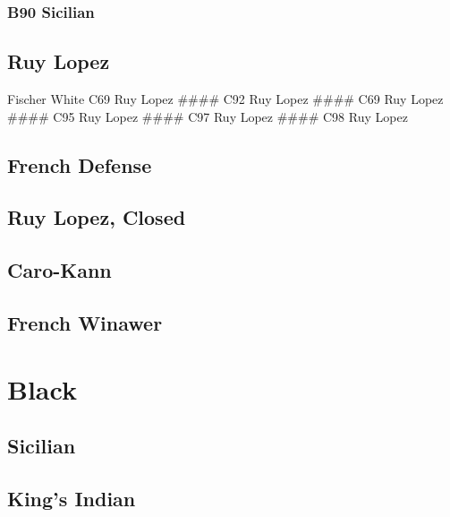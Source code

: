 \documentclass[]{book}
\begin{document}
\hypertarget{b90-sicilian}{%
\subsubsection{B90 Sicilian}\label{b90-sicilian}}

\hypertarget{ruy-lopez}{%
\subsection{Ruy Lopez}\label{ruy-lopez}}

Fischer White C69 Ruy Lopez
\#\#\#\# C92 Ruy Lopez
\#\#\#\# C69 Ruy Lopez
\#\#\#\# C95 Ruy Lopez
\#\#\#\# C97 Ruy Lopez
\#\#\#\# C98 Ruy Lopez

\hypertarget{french-defense}{%
\subsection{French Defense}\label{french-defense}}

\hypertarget{ruy-lopez-closed}{%
\subsection{Ruy Lopez, Closed}\label{ruy-lopez-closed}}

\hypertarget{caro-kann}{%
\subsection{Caro-Kann}\label{caro-kann}}

\hypertarget{french-winawer}{%
\subsection{French Winawer}\label{french-winawer}}

\hypertarget{black-2}{%
\section{Black}\label{black-2}}

\hypertarget{sicilian-1}{%
\subsection{Sicilian}\label{sicilian-1}}

\hypertarget{kings-indian}{%
\subsection{King's Indian}\label{kings-indian}}
\end{document}
